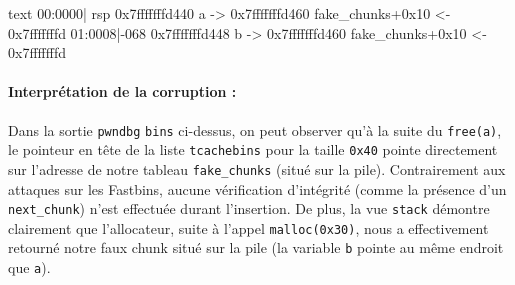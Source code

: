 \begin{pwndbg}[stack]{text}
    00:0000| rsp 0x7fffffffd440 {a} -> 0x7fffffffd460 {fake_chunks+0x10} <- 0x7fffffffd
    01:0008|-068 0x7fffffffd448 {b} -> 0x7fffffffd460 {fake_chunks+0x10} <- 0x7fffffffd
\end{pwndbg}

\paragraph{Interprétation de la corruption :}
Dans la sortie \texttt{pwndbg} \texttt{bins} ci-dessus, on peut observer qu'à la suite du \texttt{free(a)}, le pointeur en tête de la liste \texttt{tcachebins} pour la taille \texttt{0x40} pointe directement sur l'adresse de notre tableau \texttt{fake\_chunks} (situé sur la pile). Contrairement aux attaques sur les Fastbins, aucune vérification d'intégrité (comme la présence d'un \texttt{next\_chunk}) n'est effectuée durant l'insertion.
De plus, la vue \texttt{stack} démontre clairement que l'allocateur, suite à l'appel \texttt{malloc(0x30)}, nous a effectivement retourné notre faux chunk situé sur la pile (la variable \texttt{b} pointe au même endroit que \texttt{a}).


